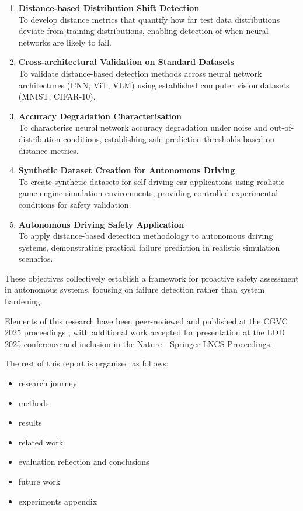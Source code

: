 \begin{enumerate}
\item \textbf{Distance-based Distribution Shift Detection} \\
To develop distance metrics that quantify how far test data distributions deviate from training distributions, enabling detection of when neural networks are likely to fail.

\item \textbf{Cross-architectural Validation on Standard Datasets} \\
To validate distance-based detection methods across neural network architectures (CNN, ViT, VLM) using established computer vision datasets (MNIST, CIFAR-10).

\item \textbf{Accuracy Degradation Characterisation} \\
To characterise neural network accuracy degradation under noise and out-of-distribution conditions, establishing safe prediction thresholds based on distance metrics.

\item \textbf{Synthetic Dataset Creation for Autonomous Driving} \\
To create synthetic datasets for self-driving car applications using realistic game-engine simulation environments, providing controlled experimental conditions for safety validation.

\item \textbf{Autonomous Driving Safety Application} \\
To apply distance-based detection methodology to autonomous driving systems, demonstrating practical failure prediction in realistic simulation scenarios.
\end{enumerate}

These objectives collectively establish a framework for proactive safety assessment in autonomous systems, focusing on failure detection rather than system hardening.

Elements of this research have been peer-reviewed and published at the CGVC 2025 proceedings \cite{sikar2024misclassificationlikelihoodmatrixclasses}, with additional work accepted for presentation at the LOD 2025 \cite{sikar2025explorationssoftmaxspaceknowing} conference and inclusion in the Nature - Springer LNCS Proceedings.

The rest of this report is organised as follows:

\begin{itemize}
    \item research journey
    \item methods
    \item results
    \item related work
    \item evaluation reflection and conclusions
    \item future work
    \item experiments appendix
\end{itemize}

